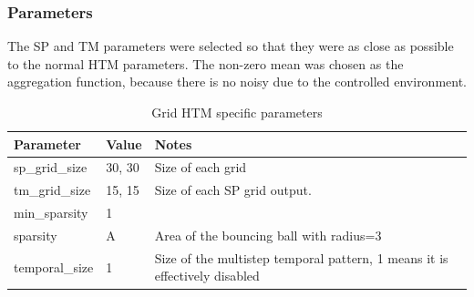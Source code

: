 \subsubsection{Parameters}
The SP and TM parameters were selected so that they were as close as possible to the normal HTM parameters. The non-zero mean was chosen as the aggregation function, because there is no noisy due to the controlled environment.
\begin{table}[H]
    \centering
    \begin{tabularx}{\linewidth}{@{}XlX@{}}
        \toprule
        \textbf{Parameter} & \textbf{Value} & \textbf{Notes}                                                             \\
        \midrule
        sp\_grid\_size     & 30, 30         & Size of each grid                                                          \\
        tm\_grid\_size     & 15, 15         & Size of each SP grid output.                                               \\
        min\_sparsity      & 1              &                                                                            \\
        sparsity           & A              & Area of the bouncing ball with radius=3                                    \\
        temporal\_size     & 1              & Size of the multistep temporal pattern, 1 means it is effectively disabled \\
        \bottomrule
    \end{tabularx}
    \caption{Grid HTM specific parameters}
    \label{tab:bb_gridhtm_params}
\end{table}
